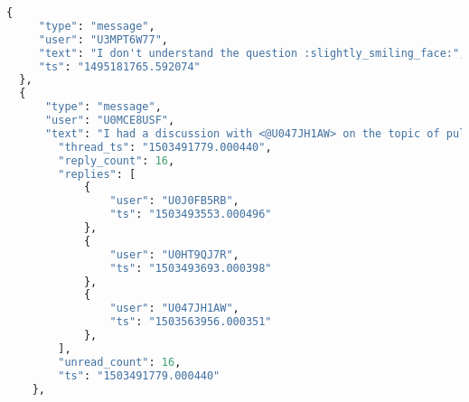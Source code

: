 \clearpage %
\begin{lstlisting}[caption={Sample of logs exported from Slack in JSON format},label={lst:json},language=Python,basicstyle=\tiny]
 {
     "type": "message",
     "user": "U3MPT6W77",
     "text": "I don't understand the question :slightly_smiling_face:",
     "ts": "1495181765.592074"
  },
  {
      "type": "message",
      "user": "U0MCE8USF",
      "text": "I had a discussion with <@U047JH1AW> on the topic of pulling through 'Multiple language support in Web client'. The suggestion is to create a separate story for 'cache key' for MVP3. <@U03V1DDPM> does this sound ok for you?",
        "thread_ts": "1503491779.000440",
        "reply_count": 16,
        "replies": [
            {
                "user": "U0J0FB5RB",
                "ts": "1503493553.000496"
            },
            {
                "user": "U0HT9QJ7R",
                "ts": "1503493693.000398"
            },
            {
                "user": "U047JH1AW",
                "ts": "1503563956.000351"
            },
        ],
        "unread_count": 16,
        "ts": "1503491779.000440"
    },
\end{lstlisting}
